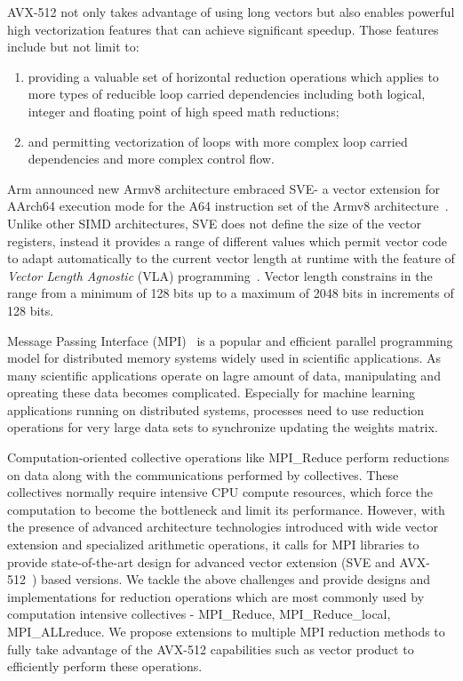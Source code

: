 \documentclass[sigconf]{acmart}
\newcommand{\mpi}[0]{\textsc{MPI}\xspace}
\newcommand{\arm}[0]{Arm\xspace}
\newcommand{\sve}[0]{\textsc{SVE}\xspace}
\begin{document}
AVX-512 not only takes advantage of using long vectors but also enables powerful high
vectorization features that can achieve significant speedup. Those features
include but not limit to:
\begin{enumerate}
  \item providing a valuable set of horizontal reduction operations which applies to more types of reducible loop carried dependencies including both logical, integer and floating point of high speed math reductions;
  \item and permitting vectorization of loops with more complex loop carried dependencies and more complex control flow.
\end{enumerate}

\arm announced new Armv8 architecture embraced \sve - a vector extension for AArch64
execution mode for the A64 instruction set of the
Armv8 architecture~\cite{arm-v8-ref, ARMv8-Architecture}.
Unlike other SIMD architectures, \sve does not define the size of
the vector registers, instead it provides a range of different values which permit vector
code to adapt automatically to the current vector length at runtime with the
feature of \emph{Vector Length Agnostic} (VLA) programming~\cite{Advanced-SIMD,vla-stencil}.
Vector length constrains in the range from a minimum of 128 bits up to
a maximum of 2048 bits in increments of 128 bits.

Message Passing Interface (\mpi)~\cite{mpi-forum} is a popular and efficient parallel
programming model for distributed memory systems widely used in scientific applications.
As many scientific applications operate on lagre amount of data, manipulating and opreating these data becomes complicated.
%
Especially for machine learning applications running on distributed systems,
processes need to use reduction operations for very large data sets to
synchronize updating the weights matrix.

Computation-oriented collective operations like MPI\_Reduce perform reductions on
data along with the communications performed by collectives.
These collectives normally require intensive CPU compute resources, which force
the computation to become the bottleneck and limit its performance.
However, with the presence of advanced architecture technologies introduced
with wide vector extension and specialized arithmetic operations, it calls for
MPI libraries to provide state-of-the-art design for advanced vector
extension (\sve and AVX-512~\cite{avx-info, Cebrian2019}) based versions.
We tackle the above challenges and provide designs and implementations
for reduction operations which are most commonly used by computation
intensive collectives - MPI\_Reduce, MPI\_Reduce\_local, MPI\_ALLreduce.
We propose extensions to multiple \mpi reduction methods to fully take
advantage of the AVX-512 capabilities such as vector product to efficiently
perform these operations.
\end{document}
